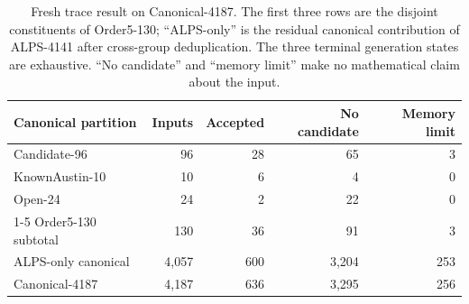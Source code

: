 \begin{table}[t]
\caption{Fresh trace result on Canonical-4187.  The first three rows are the
disjoint constituents of Order5-130; ``ALPS-only'' is the residual canonical
contribution of ALPS-4141 after cross-group deduplication.  The three terminal
generation states are exhaustive.  ``No candidate'' and ``memory limit'' make
no mathematical claim about the input.}
\label{tab:trace-full-results}
\centering
\scriptsize
\setlength{\tabcolsep}{3pt}
\begin{tabular}{@{}lrrrr@{}}
\toprule
Canonical partition & Inputs & Accepted & No candidate & Memory limit \\
\midrule
Candidate-96 & 96 & 28 & 65 & 3 \\
KnownAustin-10 & 10 & 6 & 4 & 0 \\
Open-24 & 24 & 2 & 22 & 0 \\
\cmidrule(lr){1-5}
Order5-130 subtotal & 130 & 36 & 91 & 3 \\
ALPS-only canonical & 4,057 & 600 & 3,204 & 253 \\
\midrule
Canonical-4187 & 4,187 & 636 & 3,295 & 256 \\
\bottomrule
\end{tabular}
\end{table}
